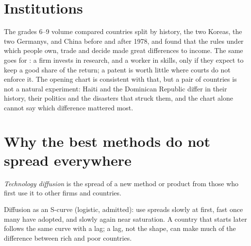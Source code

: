 \section{Institutions}\label{sec:g12:ideas-institutions-growth:institutions}

The grades 6--9 volume compared countries split by history, the two Koreas, the two Germanys, and China before and after 1978, and found that the rules under which people
own, trade and decide made great differences to income. The same goes for : a firm invests in research, and a worker in skills, only if they expect to keep a good share
of the return; a patent is worth little where courts do not enforce it. The opening chart is consistent with that, but a pair of countries is not a natural experiment:
Haiti and the Dominican Republic differ in their history, their politics and the disasters that struck them, and the chart alone cannot say which difference mattered most.

\section{Why the best methods do not spread everywhere}\label{sec:g12:ideas-institutions-growth:diffusion}

\begin{definition}\label{def:g12:ideas-institutions-growth:diffusion}
\emph{Technology diffusion} is the spread of a new method or product from those who first use it to other firms and countries.
\end{definition}

\begin{omfigure}

{\small Diffusion as an S-curve (logistic, admitted): use spreads slowly at first, fast once many have adopted, and slowly again near saturation. A country that starts
later follows the same curve with a lag; a lag, not the shape, can make much of the difference between rich and poor countries.}
\end{omfigure}

